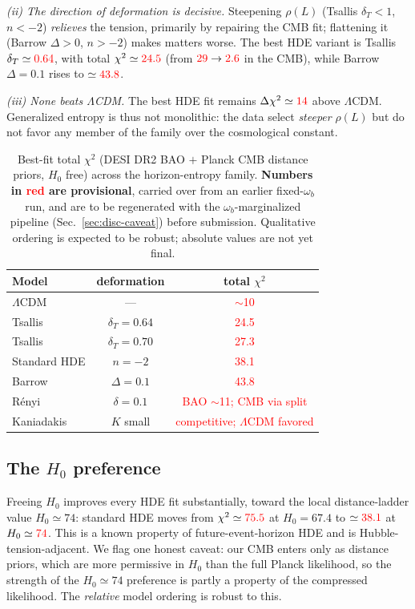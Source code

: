 \documentclass[twocolumn,10pt]{article}
\newcommand{\prov}[1]{\textcolor{red}{#1}}
\begin{document}
\emph{(ii) The direction of deformation is decisive.} Steepening $\rho(L)$
(Tsallis $\delta_T<1$, $n<-2$) \emph{relieves} the tension, primarily by
repairing the CMB fit; flattening it (Barrow $\Delta>0$, $n>-2$) makes matters
worse. The best HDE variant is Tsallis $\delta_T\simeq\prov{0.64}$, with total
$\chi^2\simeq\prov{24.5}$ (from $\prov{29}\to\prov{2.6}$ in the CMB), while
Barrow $\Delta=0.1$ rises to $\simeq\prov{43.8}$.

\emph{(iii) None beats $\Lambda$CDM.} The best HDE fit remains
$\Delta\chi^2\simeq\prov{14}$ above $\Lambda$CDM. Generalized entropy is thus
not monolithic: the data select \emph{steeper} $\rho(L)$ but do not favor any
member of the family over the cosmological constant.

\begin{table}[t]
\caption{Best-fit total $\chi^2$ (DESI DR2 BAO $+$ Planck CMB distance priors,
$H_0$ free) across the horizon-entropy family. \textbf{Numbers in
\prov{red} are provisional}, carried over from an earlier fixed-$\omega_b$ run,
and are to be regenerated with the $\omega_b$-marginalized pipeline
(Sec.~\ref{sec:disc-caveat}) before submission. Qualitative ordering
is expected to be robust; absolute values are not yet final.}
\label{tab:chi2}
\begin{center}\small
\begin{tabular}{lcc}\hline\hline
Model & deformation & total $\chi^2$ \\
\hline
\hline
$\Lambda$CDM & --- & \prov{$\sim$10} \\
Tsallis & $\delta_T=0.64$ & \prov{24.5} \\
Tsallis & $\delta_T=0.70$ & \prov{27.3} \\
Standard HDE & $n=-2$ & \prov{38.1} \\
Barrow & $\Delta=0.1$ & \prov{43.8} \\
R\'enyi & $\delta=0.1$ & \prov{BAO $\sim$11; CMB via split} \\
Kaniadakis & $K$ small & \prov{competitive; $\Lambda$CDM favored} \\
\hline\hline
\end{tabular}
\end{center}
\end{table}

\subsection{The $H_0$ preference}

Freeing $H_0$ improves every HDE fit substantially, toward the local
distance-ladder value $H_0\simeq74$: standard HDE moves from
$\chi^2\simeq\prov{75.5}$ at $H_0=67.4$ to $\simeq\prov{38.1}$ at
$H_0\simeq\prov{74}$. This is a known property of future-event-horizon HDE and
is Hubble-tension-adjacent. We flag one honest caveat: our CMB enters only as
distance priors, which are more permissive in $H_0$ than the full Planck
likelihood, so the strength of the $H_0\simeq74$ preference is partly a
property of the compressed likelihood. The \emph{relative} model ordering is
robust to this.
\end{document}
